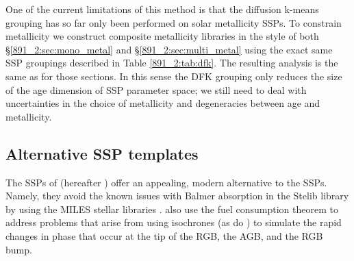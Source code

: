 



One of the current limitations of this method is that the diffusion k-means
grouping has so far only been performed on solar metallicity SSPs. To
constrain metallicity we construct composite metallicity libraries in the
style of both \S\ref{891_2:sec:mono_metal} and \S\ref{891_2:sec:multi_metal} using the
exact same SSP groupings described in Table \ref{891_2:tab:dfk}. The resulting
analysis is the same as for those sections. In this sense the DFK grouping
only reduces the size of the age dimension of SSP parameter space; we still
need to deal with uncertainties in the choice of metallicity and degeneracies
between age and metallicity.

\subsection{Alternative SSP templates}
\label{891_2:sec:ma11}

The SSPs of \citet{Maraston11} (hereafter )
offer an appealing, modern alternative to the 
SSPs. Namely, they avoid the known issues with Balmer absorption in
the Stelib library \citep{Groves11} by using the MILES stellar
libraries \citep{Vazdekis10,Falcon-Barroso11}. 
also use the fuel consumption theorem
\citep{Renzini81,Buzzoni89,Maraston05} to address problems that arise
from using isochrones (as do ) to simulate the
rapid changes in phase that occur at the tip of the RGB, the AGB, and
the RGB bump.

